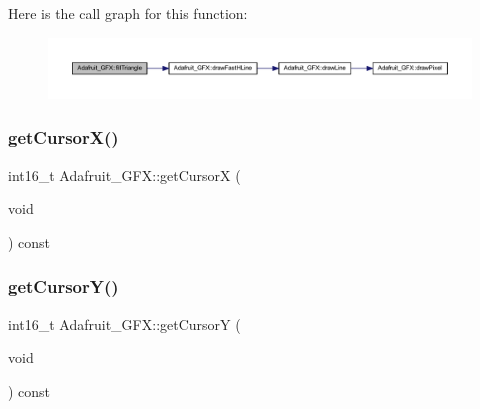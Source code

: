 Here is the call graph for this function\+:
\nopagebreak
\begin{figure}[H]
\begin{center}
\leavevmode
\includegraphics[width=350pt]{d9/d97/class_adafruit___g_f_x_a4cd646a3d9c9d5b3ee50010d0aa387cd_cgraph}
\end{center}
\end{figure}
\mbox{\label{class_adafruit___g_f_x_a0d1d15f5f15cad95b4c20f0e9ac9c74b}} 
\subsubsection{\texorpdfstring{get\+Cursor\+X()}{getCursorX()}}
{\footnotesize\ttfamily int16\+\_\+t Adafruit\+\_\+\+G\+F\+X\+::get\+CursorX (\begin{DoxyParamCaption}\item[{void}]{ }\end{DoxyParamCaption}) const}

\mbox{\label{class_adafruit___g_f_x_a81c8558cfcb717c4cfbd5475998daed1}} 
\subsubsection{\texorpdfstring{get\+Cursor\+Y()}{getCursorY()}}
{\footnotesize\ttfamily int16\+\_\+t Adafruit\+\_\+\+G\+F\+X\+::get\+CursorY (\begin{DoxyParamCaption}\item[{void}]{ }\end{DoxyParamCaption}) const}

\mbox{\label{class_adafruit___g_f_x_ab90e1378511b93189a7b557d7dda5d73}} 
